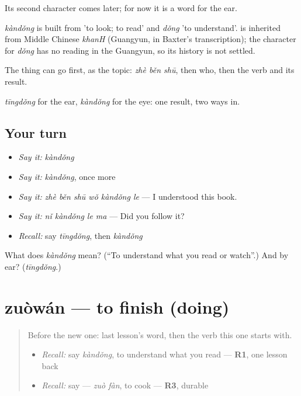 Its second character comes later; for now it is a word for the ear.

\begin{cousinweb}
\emph{kàndǒng} is built from  'to look; to read' and \emph{dǒng} 'to understand'.  is inherited from Middle Chinese \emph{khanH} (Guangyun, in Baxter's transcription); the character for \emph{dǒng} has no reading in the Guangyun, so its history is not settled.
\end{cousinweb}

\begin{grammarlens}[title={What you've built}]
The thing can go first, as the topic: \emph{zhè běn shū}, then who, then the verb and its result.

\emph{tīngdǒng} for the ear, \emph{kàndǒng} for the eye: one result, two ways in.
\end{grammarlens}

\subsection*{Your turn}
\begin{itemize}
\raggedright
  \item \emph{Say it:} \emph{kàndǒng}
  \item \emph{Say it:} \emph{kàndǒng}, once more
  \item \emph{Say it:} \emph{zhè běn shū wǒ kàndǒng le} — I understood this book.
  \item \emph{Say it:} \emph{nǐ kàndǒng le ma} — Did you follow it?
  \item \emph{Recall:} say \emph{tīngdǒng}, then \emph{kàndǒng}
\end{itemize}

\begin{tcolorbox}[breakable,colback=teal!4,colframe=teal!35!black,title={Before you move on}]
What does \emph{kàndǒng} mean? (\textquotedblleft{}To understand what you read or watch\textquotedblright{}.) And by ear? (\emph{tīngdǒng}.)
\end{tcolorbox}
\section[zuòwán]{zuòwán — to finish (doing)}

\label{lesson:ZH-C151-zuowan}



\begin{quote}
Before the new one: last lesson's word, then the verb this one starts with.

\begin{itemize}
\raggedright
  \item \emph{Recall:} say \emph{kàndǒng}, to understand what you read — \textbf{R1}, one lesson back
  \item \emph{Recall:} say  — \emph{zuò fàn}, to cook — \textbf{R3}, durable
\end{itemize}
\end{quote}

